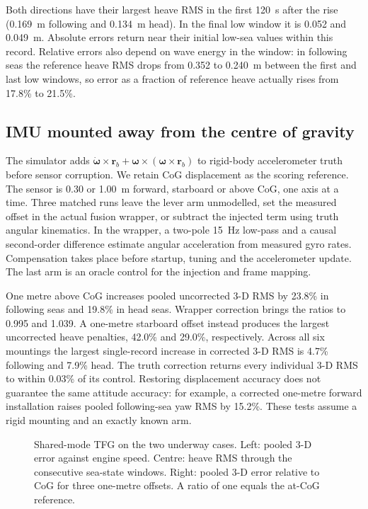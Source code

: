 \documentclass[conference]{IEEEtran}
\newcommand{\IncludePGF}[1]{\resizebox{\linewidth}{!}{}}
\newcommand{\vc}[1]{\bm{#1}}
\begin{document}


Both directions have their largest heave RMS in the first 120~s after the rise
(0.169~m following and 0.134~m head). In the final low window it is 0.052
and 0.049~m. Absolute errors return near their initial low-sea values within
this record. Relative errors also depend on wave energy in the window: in
following seas the reference heave RMS drops from 0.352 to 0.240~m between
the first and last low windows, so error as a fraction of reference heave
actually rises from 17.8\% to 21.5\%.

\subsection{IMU mounted away from the centre of gravity}
The simulator adds $\dot{\vc\omega}\times\vc r_b+
\vc\omega\times(\vc\omega\times\vc r_b)$ to rigid-body accelerometer truth
before sensor corruption. We retain CoG displacement as the scoring reference.
The sensor is 0.30 or 1.00~m forward, starboard or above CoG, one axis at a time.
Three matched runs leave the lever arm unmodelled, set the measured offset
in the actual fusion wrapper, or subtract the injected term using truth
angular kinematics. In the wrapper, a two-pole 15~Hz low-pass and a causal
second-order difference estimate angular acceleration from measured gyro
rates. Compensation takes place before startup, tuning and the accelerometer
update. The last arm is an oracle control for the injection and frame mapping.



One metre above CoG increases pooled uncorrected 3-D RMS by 23.8\% in
following seas and 19.8\% in head seas. Wrapper correction brings the ratios
to 0.995 and 1.039. A one-metre starboard offset instead produces the largest
uncorrected heave penalties, 42.0\% and 29.0\%, respectively. Across all
six mountings the largest single-record increase in corrected 3-D RMS is
4.7\% following and 7.9\% head. The truth correction returns every individual
3-D RMS to within 0.03\% of its control. Restoring displacement accuracy does
not guarantee the same attitude accuracy: for example, a corrected one-metre
forward installation raises pooled following-sea yaw RMS by 15.2\%. These
tests assume a rigid mounting and an exactly known arm.

\begin{figure}[!t]\centering
\IncludePGF{../../reports/results/tfg_shared_modes/degradation/underway_degradation.pgf}
\caption{Shared-mode TFG on the two underway cases. Left: pooled 3-D error
against engine speed. Centre: heave RMS through the consecutive sea-state
windows. Right: pooled 3-D error relative to CoG for three one-metre offsets.
A ratio of one equals the at-CoG reference.}
\end{figure}
\end{document}
